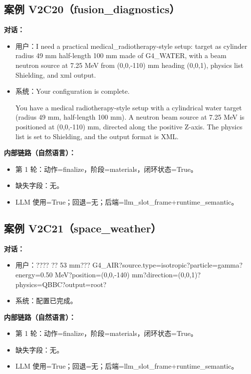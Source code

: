 \documentclass[11pt]{ctexart}
\begin{document}
\subsection{案例 V2C20（fusion\_diagnostics）}
\textbf{对话：}
\begin{itemize}
\item 用户：I need a practical medical\_radiotherapy-style setup: target as cylinder radius 49 mm half-length 100 mm made of G4\_WATER, with a beam neutron source at 7.25 MeV from (0,0,-110) mm heading (0,0,1), physics list Shielding, and xml output.
\item 系统：Your configuration is complete.

You have a medical radiotherapy-style setup with a cylindrical water target (radius 49 mm, half-length 100 mm). A neutron beam source at 7.25 MeV is positioned at (0,0,-110) mm, directed along the positive Z-axis. The physics list is set to Shielding, and the output format is XML.
\end{itemize}
\textbf{内部链路（自然语言）：}
\begin{itemize}
\item 第 1 轮：动作=finalize，阶段=materials，闭环状态=True。
\item 缺失字段：无。
\item LLM 使用=True；回退=无；后端=llm\_slot\_frame+runtime\_semantic。
\end{itemize}
\subsection{案例 V2C21（space\_weather）}
\textbf{对话：}
\begin{itemize}
\item 用户：???? ?? 53 mm??? G4\_AIR?source.type=isotropic?particle=gamma?energy=0.50 MeV?position=(0,0,-140) mm?direction=(0,0,1)?physics=QBBC?output=root?
\item 系统：配置已完成。
\end{itemize}
\textbf{内部链路（自然语言）：}
\begin{itemize}
\item 第 1 轮：动作=finalize，阶段=materials，闭环状态=True。
\item 缺失字段：无。
\item LLM 使用=True；回退=无；后端=llm\_slot\_frame+runtime\_semantic。
\end{itemize}
\end{document}
